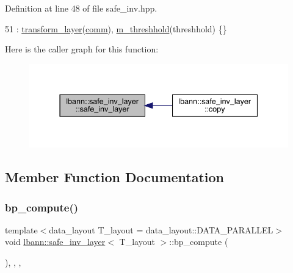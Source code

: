 Definition at line 48 of file safe\+\_\+inv.\+hpp.


\begin{DoxyCode}
51     : \hyperlink{classlbann_1_1transform__layer_a4b72501e0f4d0745c8b13c5331055e65}{transform\_layer}(\hyperlink{file__io_8cpp_ab048c6f9fcbcfaa57ce68b00263dbebe}{comm}), \hyperlink{classlbann_1_1safe__inv__layer_ae8978232b726f450b961a63e5ff33279}{m\_threshhold}(threshhold) \{\}
\end{DoxyCode}
Here is the caller graph for this function\+:\nopagebreak
\begin{figure}[H]
\begin{center}
\leavevmode
\includegraphics[width=337pt]{classlbann_1_1safe__inv__layer_a8568b80fcabd1427eaa4b4deed294f5e_icgraph}
\end{center}
\end{figure}


\subsection{Member Function Documentation}
\mbox{\label{classlbann_1_1safe__inv__layer_a6c9d917f226b718733ee60da9da0291b}} 
\subsubsection{\texorpdfstring{bp\+\_\+compute()}{bp\_compute()}}
{\footnotesize\ttfamily template$<$data\+\_\+layout T\+\_\+layout = data\+\_\+layout\+::\+D\+A\+T\+A\+\_\+\+P\+A\+R\+A\+L\+L\+EL$>$ \\
void \hyperlink{classlbann_1_1safe__inv__layer}{lbann\+::safe\+\_\+inv\+\_\+layer}$<$ T\+\_\+layout $>$\+::bp\+\_\+compute (\begin{DoxyParamCaption}{ }\end{DoxyParamCaption})\hspace{0.3cm}{\ttfamily [inline]}, {\ttfamily [override]}, {\ttfamily [protected]}, {\ttfamily [virtual]}}

